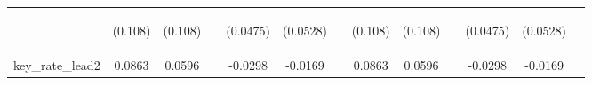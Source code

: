 \documentclass[]{article}
\begin{document}
\begin{center}
\begin{tabular}{lcccccccccccc}
\vspace{4pt} & \begin{footnotesize}(0.108)\end{footnotesize} & \begin{footnotesize}(0.108)\end{footnotesize} & \begin{footnotesize}\end{footnotesize} & \begin{footnotesize}(0.0475)\end{footnotesize} & \begin{footnotesize}(0.0528)\end{footnotesize} & \begin{footnotesize}\end{footnotesize} & \begin{footnotesize}(0.108)\end{footnotesize} & \begin{footnotesize}(0.108)\end{footnotesize} & \begin{footnotesize}\end{footnotesize} & \begin{footnotesize}(0.0475)\end{footnotesize} & \begin{footnotesize}(0.0528)\end{footnotesize} & \begin{footnotesize}\end{footnotesize} \\
key\_rate\_lead2 & 0.0863 & 0.0596 &  & -0.0298 & -0.0169 &  & 0.0863 & 0.0596 &  & -0.0298 & -0.0169 &  \\

\end{tabular}
\end{center}
\end{document}
